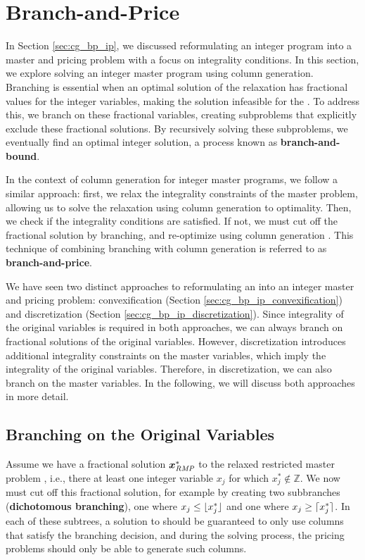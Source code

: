 \section{Branch-and-Price}\label{sec:cg_bp_bp}
In Section \ref{sec:cg_bp_ip}, we discussed reformulating an integer program into a master and pricing problem with a focus on integrality conditions. In this section, we explore solving an integer master program using column generation. Branching is essential when an optimal solution of the \LP{} relaxation has fractional values for the integer variables, making the solution infeasible for the \IP{}. To address this, we branch on these fractional variables, creating subproblems that explicitly exclude these fractional solutions. By recursively solving these subproblems, we eventually find an optimal integer solution, a process known as \textbf{branch-and-bound}.

In the context of column generation for integer master programs, we follow a similar approach: first, we relax the integrality constraints of the master problem, allowing us to solve the relaxation using column generation to optimality. Then, we check if the integrality conditions are satisfied. If not, we must cut off the fractional solution by branching, and re-optimize using column generation \cite{thebook}. This technique of combining branching with column generation is referred to as \textbf{branch-and-price}.

We have seen two distinct approaches to reformulating an \IP{} into an integer master and pricing problem: convexification (Section \ref{sec:cg_bp_ip_convexification}) and discretization (Section \ref{sec:cg_bp_ip_discretization}). Since integrality of the original variables is required in both approaches, we can always branch on fractional solutions of the original variables. However, discretization introduces additional integrality constraints on the master variables, which imply the integrality of the original variables. Therefore, in discretization, we can also branch on the master variables. In the following, we will discuss both approaches in more detail.

\subsection{Branching on the Original Variables}\label{sec:cg_bp_bp_branching_original}
Assume we have a fractional solution ${\bm{x}}^*_{\textit{RMP}}{}$ to the relaxed restricted master problem \RMP{}, i.e., there at least one integer variable $x_j$ for which $x_j^* \not\in \mathbb{Z}$. We now must cut off this fractional solution, for example by creating two subbranches (\textbf{dichotomous branching}), one where $x_j \leq \lfloor x_j^*\rfloor$ and one where $x_j \geq \lceil x_j^*\rceil$. In each of these subtrees, a solution to \RMP{} should be guaranteed to only use columns that satisfy the branching decision, and during the solving process, the pricing problems should only be able to generate such columns.


